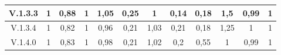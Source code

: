 \documentclass[conference]{IEEEtran}
\begin{document}
\begin{table}
\begin{tabular}{|c|c|c|c|c|c|c|c|c|c|c|c|}
V.1.3.3           & 1                      & 0,88                 & 1                  & 1,05               & 0,25                 & 1                    & 0,14              & 0,18                 & 1,5               & 0,99                & 1                 \\ \hline
V.1.3.4           & 1                      & 0,82                 & 1                  & 0,96               & 0,21                 & 1,03                 & 0,21              & 0,18                 & 1,25              & 1                   & 1                 \\ \hline
V.1.4.0           & 1                      & 0,83                 & 1                  & 0,98               & 0,21                 & 1,02                 & 0,2               & 0,55                 & 1                 & 0,99                & 1                 \\ \hline
\end{tabular}
\end{table}
\end{document}
